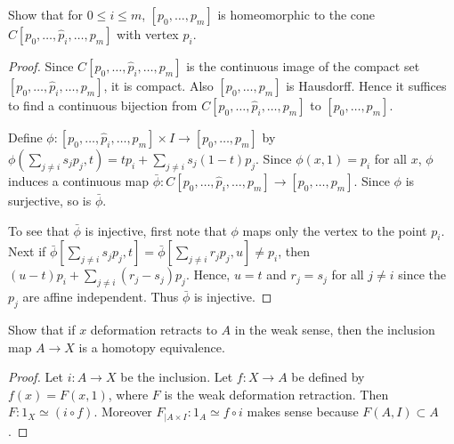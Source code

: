 \documentclass{article}
\begin{document}
 Show that for $0 \le i \le m$, $[p_0, \ldots, p_m]$ is homeomorphic to the cone
$C[p_0, \ldots, \hat p_i, \ldots, p_m]$ with vertex $p_i$.
\begin{proof}
Since $C[p_0, \ldots, \hat p_i, \ldots, p_m]$ is the continuous image of the compact set
$[p_0, \ldots, \hat p_i, \ldots, p_m]$, it is compact.  Also $[p_0, \ldots, p_m]$ is Hausdorff.
Hence it suffices to find a continuous bijection from $C[p_0, \ldots, \hat p_i, \ldots, p_m]$
to $[p_0, \ldots,  p_m]$.

Define $\phi: [p_0, \ldots, \hat p_i, \ldots, p_m] \times I \to [p_0, \ldots,  p_m]$ by
$\phi( \sum_{j \neq i} s_j p_j, t) = t p_i + \sum_{j \neq i} s_j (1-t) p_j$.
Since $\phi(x, 1) = p_i$ for all $x$, $\phi$ induces a continuous map 
$\bar \phi : C[p_0, \ldots, \hat p_i, \ldots, p_m] \to [p_0, \ldots,  p_m]$. Since $\phi$ is surjective, so is $\bar \phi$.

To see that $\bar \phi$ is injective, first note that $\phi$ maps only the vertex to the point $p_i$. Next if
$\bar \phi [\sum_{j \neq i} s_j p_j, t]  = \bar \phi [\sum_{j \neq i} r_j p_j, u] \neq p_i$, then
$(u-t) p_i + \sum_{j \neq i} (r_j - s_j) p_j$.  Hence, $u = t$ and $r_j = s_j$ for all $j \neq i$ since
the $p_j$ are affine independent.  Thus $\bar \phi$ is injective.
\end{proof}

  Show that if $x$ deformation retracts to $A$ in the weak sense, then the
inclusion map $A \to X$ is a homotopy equivalence.
\begin{proof}
Let $i: A \to X$ be the inclusion. Let $f:X \to A$ be defined by $f(x) = F(x,1)$, where $F$
is the weak deformation retraction.  Then $F:1_X \simeq (i \circ f)$.
Moreover $F_{\vert A \times I}: 1_A \simeq f \circ i$ makes sense because $F(A,I) \subset A$.
\end{proof}
\end{document}
